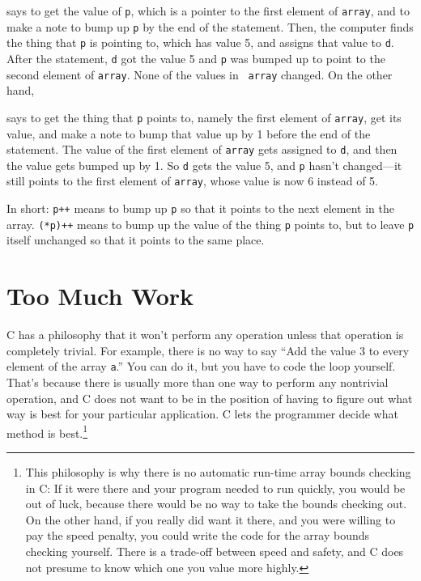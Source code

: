 \begin{itemize}
\noindent says to get the value of {\tt p}, which is a pointer to the first
element of {\tt array}, and to make a note to bump up {\tt p} by the end
of the statement.  Then, the computer finds the thing that {\tt p} is
pointing to, which has value 5, and assigns that value to {\tt d}.
After the statement, {\tt d} got the value 5 and {\tt p} was bumped up
to point to the second element of {\tt array}.  None of the values in {\tt
array} changed.  On the other hand,

\begin{flushleft}
\verb% d = (*p)++;% 
\end{flushleft}

\noindent says to get the thing that {\tt p} points to, namely the first
element of {\tt array}, get its value, and make a note to bump that value
up by 1 before the end of the statement.  The value of the first element
of {\tt array} gets assigned to {\tt d}, and then the value gets bumped up
by 1.  So {\tt d} gets the value 5, and {\tt p} hasn't changed---it
still points to the first element of {\tt array}, whose value is now 6
instead of 5.

In short:  {\tt p++} means to bump up {\tt p} so that it points to the
next element in the array.  {\tt (*p)++} means to bump up the value of
the thing {\tt p} points to, but to leave {\tt p} itself unchanged so
that it points to the same place. 

\end{itemize}

\section{Too Much Work}

C has a philosophy that it won't perform any operation unless that
operation is completely trivial.  For example, there is no way to say
``Add the value 3 to every element of the array {\tt a}.''  You can do
it, but you have to code the loop yourself.  That's because there is
usually more than one way to perform any nontrivial operation, and C
does not want to be in the position of having to figure out what way is
best for your particular application.  C lets the programmer decide what
method is best.\footnote{This philosophy is why there is no automatic
run-time array bounds checking in C: If it were there and your program
needed to run quickly, you would be out of luck, because there would be
no way to take the bounds checking out.  On the other hand, if you
really did want it there, and you were willing to pay the speed penalty,
you could write the code for the array bounds checking yourself.  There
is a trade-off between speed and safety, and C does not presume to know
which one you value more highly.}  

